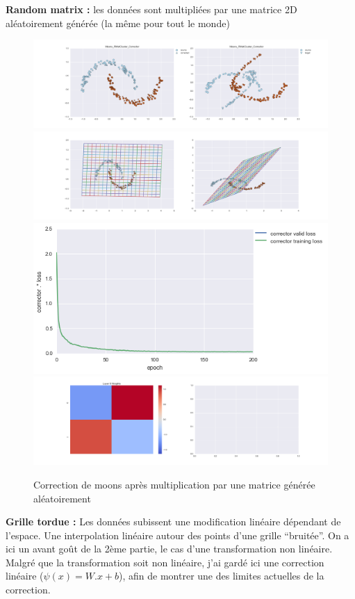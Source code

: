 {\Large \textbf{Random matrix :}} les données sont multipliées par une matrice 2D aléatoirement générée
 (la même pour tout le monde)

\begin{figure}[H] %
\centering
\includegraphics[width=\linewidth]{fig/24-05-2016/moons/Moons_RMatCluster_Corrector-DATA.png}
\includegraphics[width=\linewidth]{fig/24-05-2016/moons/Moons_RMatCluster_Corrector-GridCheck.png}
\includegraphics[width=0.45\linewidth]{fig/24-05-2016/moons/Moons_RMatCluster_Corrector-Learning_curve.png}
\includegraphics[width=\linewidth]{fig/24-05-2016/moons/Moons_RMatCluster_Corrector-W.png}
\caption{Correction de moons après multiplication par une matrice générée aléatoirement}
\label{fig:recap-moons-RMat-cluster}
\end{figure}


{\Large \textbf{Grille tordue :}} Les données subissent une modification linéaire dépendant de l'espace.
Une interpolation linéaire autour des points d'une grille ``bruitée''.
On a ici un avant goût de la 2ème partie, le cas d'une transformation non linéaire.
Malgré que la transformation soit non linéaire, j'ai gardé ici une correction linéaire ($\psi(x) = W.x+b$),
afin de montrer une des limites actuelles de la correction.

